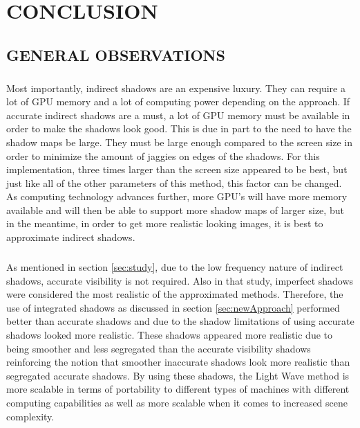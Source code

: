 \chapter{CONCLUSION}

\section{GENERAL OBSERVATIONS}
\paragraph{}
Most importantly, indirect shadows are an expensive luxury.  They can require a lot of GPU memory and a lot of computing power depending on the approach.  If accurate indirect shadows are a must, a lot of GPU memory must be available in order to make the shadows look good.  This is due in part to the need to have the shadow maps be large.  They must be large enough compared to the screen size in order to minimize the amount of jaggies on edges of the shadows.  For this implementation, three times larger than the screen size appeared to be best, but just like all of the other parameters of this method, this factor can be changed.  As computing technology advances further, more GPU's will have more memory available and will then be able to support more shadow maps of larger size, but in the meantime, in order to get more realistic looking images, it is best to approximate indirect shadows.

\paragraph{}
As mentioned in section \ref{sec:study}, due to the low frequency nature of indirect shadows, accurate visibility is not required.  Also in that study, imperfect shadows were considered the most realistic of the approximated methods.  Therefore, the use of integrated shadows as discussed in section \ref{sec:newApproach} performed better than accurate shadows and due to the shadow limitations of using accurate shadows looked more realistic.  These shadows appeared more realistic due to being smoother and less segregated than the accurate visibility shadows reinforcing the notion that smoother inaccurate shadows look more realistic than segregated accurate shadows.  By using these shadows, the Light Wave method is more scalable in terms of portability to different types of machines with different computing capabilities as well as more scalable when it comes to increased scene complexity.

